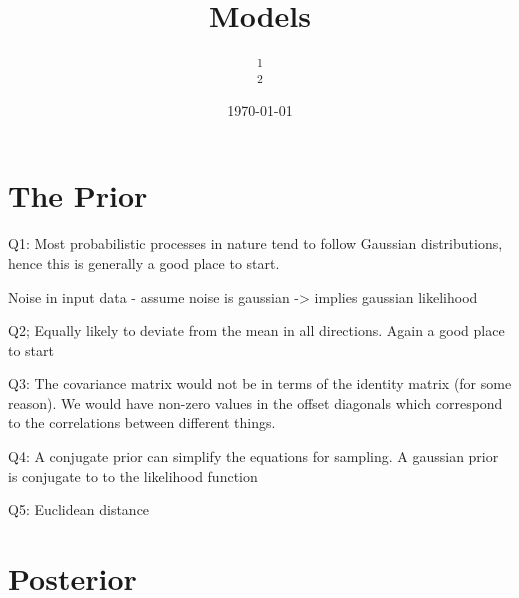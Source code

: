 \documentclass[10pt, a4paper, twocolumn]{article} %
\title{Models} %
\author{
	\authorstyle{Justin Salmon\textsuperscript{1} and George Lancaster\textsuperscript{2}} %
	\newline\newline %
	\textsuperscript{1}\institution{wr18313}\\ %
	\textsuperscript{2}\institution{qv18258} %
}
\date{\today} %
\begin{document}
\maketitle %

\thispagestyle{firstpage} %



\section{The Prior}

Q1: Most probabilistic processes in nature tend to follow Gaussian distributions, hence this is generally a good place to start.

Noise in input data - assume noise is gaussian -> implies gaussian likelihood

Q2; Equally likely to deviate from the mean in all directions. Again a good place to start

Q3: The covariance matrix would not be in terms of the identity matrix (for some reason). We would have non-zero values in the offset diagonals which correspond to the correlations between different things.

Q4: A conjugate prior can simplify the equations for sampling. A gaussian prior is conjugate to to the likelihood function

Q5: Euclidean distance

\section{Posterior}
\end{document}
